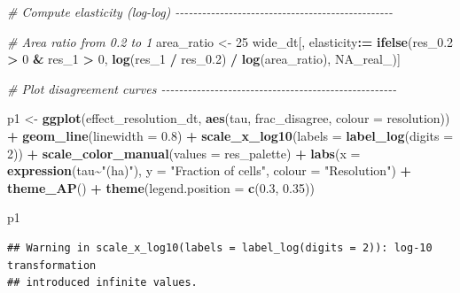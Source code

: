 \documentclass[
  11pt,
]{article}
\newenvironment{Shaded}{\begin{snugshade}}{\end{snugshade}}
\newcommand{\AttributeTok}[1]{\textcolor[rgb]{0.13,0.29,0.53}{#1}}
\newcommand{\CommentTok}[1]{\textcolor[rgb]{0.56,0.35,0.01}{\textit{#1}}}
\newcommand{\ConstantTok}[1]{\textcolor[rgb]{0.56,0.35,0.01}{#1}}
\newcommand{\DecValTok}[1]{\textcolor[rgb]{0.00,0.00,0.81}{#1}}
\newcommand{\FloatTok}[1]{\textcolor[rgb]{0.00,0.00,0.81}{#1}}
\newcommand{\FunctionTok}[1]{\textcolor[rgb]{0.13,0.29,0.53}{\textbf{#1}}}
\newcommand{\NormalTok}[1]{#1}
\newcommand{\OtherTok}[1]{\textcolor[rgb]{0.56,0.35,0.01}{#1}}
\newcommand{\SpecialCharTok}[1]{\textcolor[rgb]{0.81,0.36,0.00}{\textbf{#1}}}
\newcommand{\StringTok}[1]{\textcolor[rgb]{0.31,0.60,0.02}{#1}}
\begin{document}
\begin{Shaded}
\begin{Highlighting}[]
\CommentTok{\# Compute elasticity (log{-}log) {-}{-}{-}{-}{-}{-}{-}{-}{-}{-}{-}{-}{-}{-}{-}{-}{-}{-}{-}{-}{-}{-}{-}{-}{-}{-}{-}{-}{-}{-}{-}{-}{-}{-}{-}{-}{-}{-}{-}{-}{-}{-}{-}{-}{-}{-}{-}{-}{-}}

\CommentTok{\# Area ratio from 0.2 to 1}
\NormalTok{area\_ratio }\OtherTok{\textless{}{-}} \DecValTok{25}
\NormalTok{wide\_dt[, elasticity}\SpecialCharTok{:=} \FunctionTok{ifelse}\NormalTok{(res\_0}\FloatTok{.2} \SpecialCharTok{\textgreater{}} \DecValTok{0} \SpecialCharTok{\&}\NormalTok{ res\_1 }\SpecialCharTok{\textgreater{}} \DecValTok{0}\NormalTok{,}
                              \FunctionTok{log}\NormalTok{(res\_1 }\SpecialCharTok{/}\NormalTok{ res\_0}\FloatTok{.2}\NormalTok{) }\SpecialCharTok{/} \FunctionTok{log}\NormalTok{(area\_ratio), }\ConstantTok{NA\_real\_}\NormalTok{)]}

\CommentTok{\# Plot disagreement curves {-}{-}{-}{-}{-}{-}{-}{-}{-}{-}{-}{-}{-}{-}{-}{-}{-}{-}{-}{-}{-}{-}{-}{-}{-}{-}{-}{-}{-}{-}{-}{-}{-}{-}{-}{-}{-}{-}{-}{-}{-}{-}{-}{-}{-}{-}{-}{-}{-}{-}{-}{-}{-}}

\NormalTok{p1 }\OtherTok{\textless{}{-}} \FunctionTok{ggplot}\NormalTok{(effect\_resolution\_dt, }\FunctionTok{aes}\NormalTok{(tau, frac\_disagree, }\AttributeTok{colour =}\NormalTok{ resolution)) }\SpecialCharTok{+}
  \FunctionTok{geom\_line}\NormalTok{(}\AttributeTok{linewidth =} \FloatTok{0.8}\NormalTok{) }\SpecialCharTok{+}
  \FunctionTok{scale\_x\_log10}\NormalTok{(}\AttributeTok{labels =} \FunctionTok{label\_log}\NormalTok{(}\AttributeTok{digits =} \DecValTok{2}\NormalTok{)) }\SpecialCharTok{+}
  \FunctionTok{scale\_color\_manual}\NormalTok{(}\AttributeTok{values =}\NormalTok{ res\_palette) }\SpecialCharTok{+}
  \FunctionTok{labs}\NormalTok{(}\AttributeTok{x =} \FunctionTok{expression}\NormalTok{(tau}\SpecialCharTok{\textasciitilde{}}\StringTok{"(ha)"}\NormalTok{),}
       \AttributeTok{y =} \StringTok{"Fraction of cells"}\NormalTok{,}
       \AttributeTok{colour =} \StringTok{"Resolution"}\NormalTok{) }\SpecialCharTok{+}
  \FunctionTok{theme\_AP}\NormalTok{() }\SpecialCharTok{+}
  \FunctionTok{theme}\NormalTok{(}\AttributeTok{legend.position =} \FunctionTok{c}\NormalTok{(}\FloatTok{0.3}\NormalTok{, }\FloatTok{0.35}\NormalTok{))}

\NormalTok{p1}
\end{Highlighting}
\end{Shaded}

\begin{verbatim}
## Warning in scale_x_log10(labels = label_log(digits = 2)): log-10 transformation
## introduced infinite values.
\end{verbatim}
\end{document}
